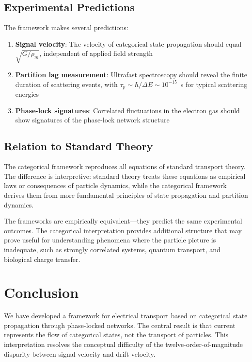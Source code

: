 \documentclass[twocolumn,showpacs,preprintnumbers,amsmath,amssymb,prd]{revtex4-2}
\newcommand{\taup}{\tau_p}
\begin{document}
\subsection{Experimental Predictions}

The framework makes several predictions:

\begin{enumerate}
\item \textbf{Signal velocity}: The velocity of categorical state propagation should equal $\sqrt{G/\rho_m}$, independent of applied field strength

\item \textbf{Partition lag measurement}: Ultrafast spectroscopy should reveal the finite duration of scattering events, with $\taup \sim \hbar/\Delta E \sim 10^{-15}$~s for typical scattering energies

\item \textbf{Phase-lock signatures}: Correlated fluctuations in the electron gas should show signatures of the phase-lock network structure
\end{enumerate}

\subsection{Relation to Standard Theory}

The categorical framework reproduces all equations of standard transport theory. The difference is interpretive: standard theory treats these equations as empirical laws or consequences of particle dynamics, while the categorical framework derives them from more fundamental principles of state propagation and partition dynamics.

The frameworks are empirically equivalent---they predict the same experimental outcomes. The categorical interpretation provides additional structure that may prove useful for understanding phenomena where the particle picture is inadequate, such as strongly correlated systems, quantum transport, and biological charge transfer.

\section{Conclusion}

We have developed a framework for electrical transport based on categorical state propagation through phase-locked networks. The central result is that current represents the flow of categorical states, not the transport of particles. This interpretation resolves the conceptual difficulty of the twelve-order-of-magnitude disparity between signal velocity and drift velocity.
\end{document}
